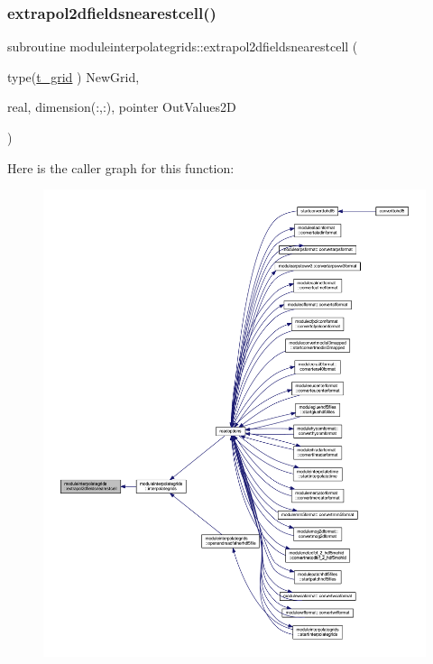 \subsubsection{\texorpdfstring{extrapol2dfieldsnearestcell()}{extrapol2dfieldsnearestcell()}}
{\footnotesize\ttfamily subroutine moduleinterpolategrids\+::extrapol2dfieldsnearestcell (\begin{DoxyParamCaption}\item[{type(\mbox{\hyperlink{structmoduleinterpolategrids_1_1t__grid}{t\+\_\+grid}} )}]{New\+Grid,  }\item[{real, dimension(\+:,\+:), pointer}]{Out\+Values2D }\end{DoxyParamCaption})\hspace{0.3cm}{\ttfamily [private]}}

Here is the caller graph for this function\+:\nopagebreak
\begin{figure}[H]
\begin{center}
\leavevmode
\includegraphics[width=350pt]{namespacemoduleinterpolategrids_a8b539cd3b43a2490e5eb54aee6abf1d0_icgraph}
\end{center}
\end{figure}
\mbox{\label{namespacemoduleinterpolategrids_a20223d63f36c638cc63f14868772d148}} 
